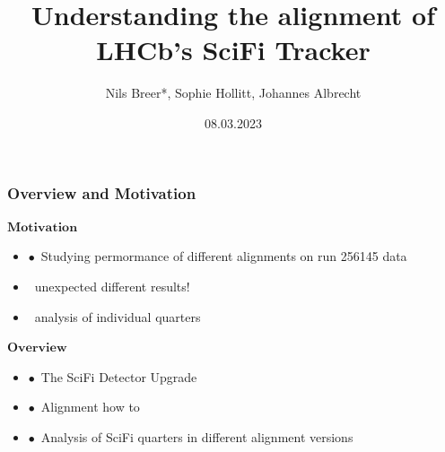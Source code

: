 \documentclass[aspectratio=1610, 12pt]{beamer}
\title{Understanding the alignment of LHCb's SciFi Tracker}
\author[N.Breer]{Nils Breer*, Sophie Hollitt, Johannes Albrecht}
\institute{TU Dortmund, Fakultät Physik}
\date{08.03.2023}
\begin{document}
\maketitle

\begin{frame}\frametitle{Overview and Motivation}
$\textbf{Motivation}$
  \begin{itemize}
    \item $\bullet$\, Studying permormance of different alignments on run 256145 data
    \item \to\, unexpected different results!
    \item \to\, analysis of individual quarters
  \end{itemize}
$\textbf{Overview}$
  \begin{itemize}
    \item $\bullet$\, The SciFi Detector Upgrade
    \item $\bullet$\, Alignment how to
    \item $\bullet$\, Analysis of SciFi quarters in different alignment versions
  \end{itemize}
\end{frame}
\end{document}
